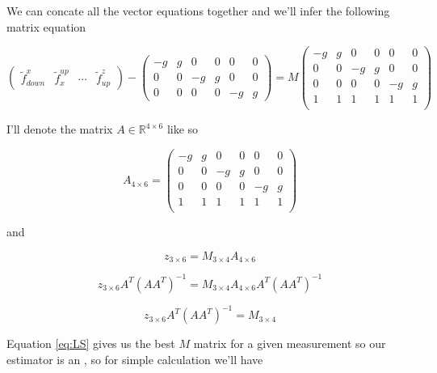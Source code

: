 \documentclass[11pt]{article}
\begin{document}
We can concate all the vector equations together and we'll infer the following matrix equation

\begin{equation*}
\begin{pmatrix}
\tilde{f}_{down}^{x} & \tilde{f}_{x}^{up} & \cdots & \tilde{f}_{up}^{z} 
\end{pmatrix}
-
\begin{pmatrix}
-g & g  & 0 & 0 & 0 &   0 \\
0 & 0 & -g & g & 0  & 0 \\
0 & 0 & 0 & 0  & -g & g
\end{pmatrix}
=M
\begin{pmatrix}
-g & g  &  0 & 0 & 0 & 0 \\ 
0 & 0  &  -g & g & 0  & 0 \\ 
0 & 0  &  0 & 0 & -g  & g \\ 
1 & 1 &  1 & 1 & 1 &1 \\ 
\end{pmatrix}
\end{equation*}

I'll denote the matrix \(A \in \mathbb{R}^{4\times 6 }\) like so 

\begin{equation*}
A_{4\times 6}=\begin{pmatrix}
-g & g  &  0 & 0 & 0 & 0 \\ 
0 & 0  &  -g & g & 0  & 0 \\ 
0 & 0  &  0 & 0 & -g  & g \\ 
1 & 1 &  1 & 1 & 1 &1 \\ 
\end{pmatrix}
\end{equation*}


and

\begin{equation*}
z_{3\times 6}=M_{3\times 4 }A_{4\times 6}
\end{equation*}

\begin{equation*}
z_{3\times 6}A^{T}(AA^{T})^{-1}=M_{3\times 4 }A_{4\times 6}A^{T}(AA^{T})^{-1}
\end{equation*}


\begin{equation}\label{eq:LS}
z_{3\times 6}A^{T}(AA^{T})^{-1}=M_{3\times 4 }
\end{equation}

Equation \ref{eq:LS} gives us the best \(M\) matrix for a given measurement
so our estimator is an , so for simple calculation we'll have
\end{document}
